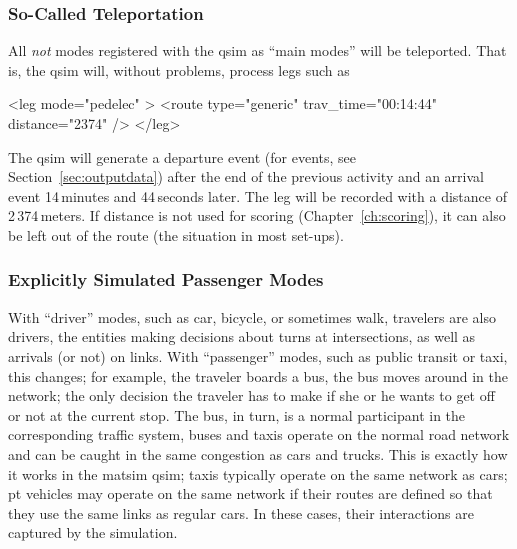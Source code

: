 \subsubsection{So-Called Teleportation}
\label{sec:teleportation-qsim}
All \emph{not} modes registered with the \gls{qsim} as ``main modes'' will be teleported.  That is, the \gls{qsim} will, without problems, process legs such as
\begin{xml}
<leg mode="pedelec" >
   <route type="generic" trav_time="00:14:44" distance="2374" />
</leg>
\end{xml}
The \gls{qsim} will generate a departure event (for events, see Section~\ref{sec:outputdata}) after the end of the previous activity and an arrival event 14\,minutes and 44\,seconds later.  The leg will be recorded with a distance of 2\,374\,meters.  If  distance is not used for  scoring (\cf Chapter~\ref{ch:scoring}), it can also be left out of the route (the situation in most set-ups).

\subsubsection{Explicitly Simulated Passenger Modes}



With ``driver'' modes, such as car, bicycle, or sometimes walk,  travelers are also drivers, \ie the entities making decisions about turns at intersections, as well as arrivals (or not) on links.
%
With ``passenger'' modes, such as public transit or taxi, this changes; for example, the traveler boards a bus, the bus moves around in the network; the only decision the traveler has to make if she or he wants to get off or not at the current stop.  The bus, in turn, is a normal participant in the corresponding traffic system, \ie buses and taxis operate on the normal road network and can be caught in the same congestion as cars and trucks.  
%
This is exactly how it works in the \gls{matsim} \gls{qsim}; taxis typically operate on the same network as cars; pt vehicles may operate on the same network if their routes are defined so that they use the same links as regular cars. 
In these cases, their interactions are captured by the simulation. 


